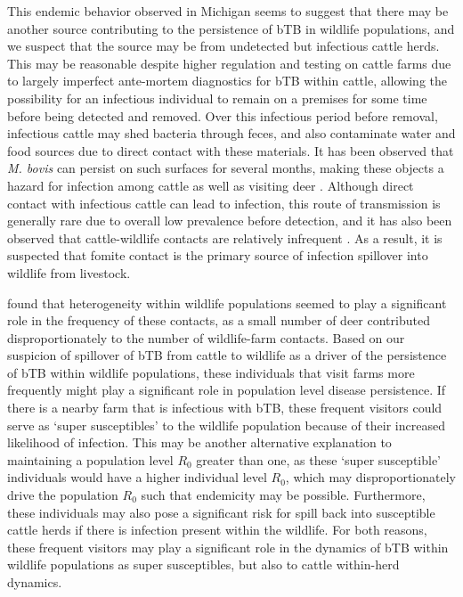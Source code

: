 \documentclass[number,preprint,review,12pt]{elsarticle}
\begin{document}
This endemic behavior observed in Michigan seems to suggest that there may be another source contributing to the persistence of bTB in wildlife populations, and we suspect that the source may be from undetected but infectious cattle herds. This may be reasonable despite higher regulation and testing on cattle farms due to largely imperfect ante-mortem diagnostics for bTB within cattle, allowing the possibility for an infectious individual to remain on a premises for some time before being detected and removed. Over this infectious period before removal, infectious cattle may shed bacteria through feces, and also contaminate water and food sources due to direct contact with these materials. It has been observed that \textit{M. bovis} can persist on such surfaces for several months, making these objects a hazard for infection among cattle as well as visiting deer \citep{allen2021does}. Although direct contact with infectious cattle can lead to infection, this route of transmission is generally rare due to overall low prevalence before detection, and it has also been observed that cattle-wildlife contacts are relatively infrequent \citep{Lavelle2016}.  As a result, it is suspected that fomite contact is the primary source of infection spillover into wildlife from livestock.

\citet{Berentsen2014} found that heterogeneity within wildlife populations seemed to play a significant role in the frequency of these contacts, as a small number of deer contributed disproportionately to the number of wildlife-farm contacts. Based on our suspicion of spillover of bTB from cattle to wildlife as a driver of the persistence of bTB within wildlife populations, these individuals that visit farms more frequently might play a significant role in population level disease persistence. If there is a nearby farm that is infectious with bTB, these frequent visitors could serve as `super susceptibles' to the wildlife population because of their increased likelihood of infection. This may be another alternative explanation to maintaining a population level $R_0$ greater than one, as these `super susceptible' individuals would have a higher individual level $R_0$, which may disproportionately drive the population $R_0$ such that endemicity may be possible. Furthermore, these individuals may also pose a significant risk for spill back into susceptible cattle herds if there is infection present within the wildlife. For both reasons, these frequent visitors may play a significant role in the dynamics of bTB within wildlife populations as super susceptibles, but also to cattle within-herd dynamics. 
\end{document}
